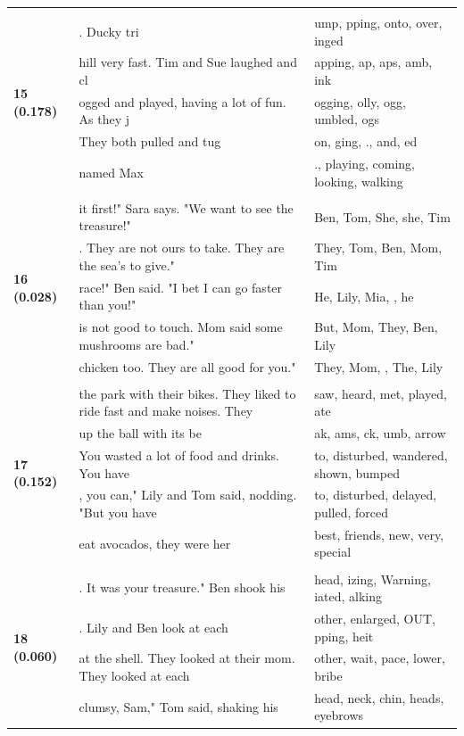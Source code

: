 \documentclass{article}
\theoremstyle{plain}
\theoremstyle{definition}
\theoremstyle{remark}
\begin{document}
\begin{longtable}{|p{}|p{}|p{}|}
& & \\
\multirow{5}{*}{\textbf{15 (0.178)}} & . Ducky tri & ump, pping,  onto,  over, inged \\
& hill very fast. Tim and Sue laughed and cl & apping, ap, aps, amb, ink \\
& ogged and played, having a lot of fun. As they j & ogging, olly, ogg, umbled, ogs \\
& They both pulled and tug & on, ging, .,  and, ed \\
& named Max & .,  playing,  coming,  looking,  walking \\
& & \\
\multirow{5}{*}{\textbf{16 (0.028)}} & it first!" Sara says. "We want to see the treasure!" & Ben,  Tom,  She,  she,  Tim \\
& . They are not ours to take. They are the sea's to give." & They,  Tom,  Ben,  Mom,  Tim \\
& race!" Ben said. "I bet I can go faster than you!" & He,  Lily,  Mia,  ,  he \\
& is not good to touch. Mom said some mushrooms are bad." & But,  Mom,  They,  Ben,  Lily \\
& chicken too. They are all good for you." & They,  Mom,  ,  The,  Lily \\
& & \\
\multirow{5}{*}{\textbf{17 (0.152)}} & the park with their bikes. They liked to ride fast and make noises. They & saw,  heard,  met,  played,  ate \\
& up the ball with its be & ak, ams, ck, umb,  arrow \\
& You wasted a lot of food and drinks. You have & to,  disturbed,  wandered,  shown,  bumped \\
& , you can," Lily and Tom said, nodding. "But you have & to,  disturbed,  delayed,  pulled,  forced \\
& eat avocados, they were her & best,  friends,  new,  very,  special \\
& & \\
\multirow{5}{*}{\textbf{18 (0.060)}} & . It was your treasure."  Ben shook his & head, izing,  Warning, iated, alking \\
& .  Lily and Ben look at each & other,  enlarged,  OUT, pping, heit \\
& at the shell. They looked at their mom. They looked at each & other,  wait,  pace,  lower,  bribe \\
& clumsy, Sam," Tom said, shaking his & head,  neck,  chin,  heads,  eyebrows \\

\end{longtable}
\end{document}
